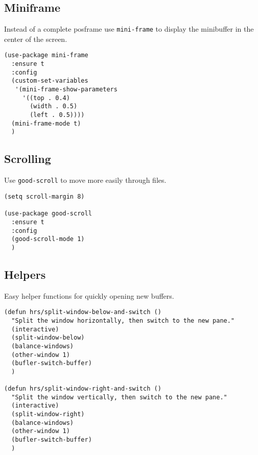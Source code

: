 \documentclass[11pt]{article}
\begin{document}
\subsection{Miniframe}
\label{sec:org151a413}
Instead of a complete posframe use \texttt{mini-frame} to display the
minibuffer in the center of the screen.
\begin{verbatim}
(use-package mini-frame
  :ensure t
  :config
  (custom-set-variables
   '(mini-frame-show-parameters
     '((top . 0.4)
       (width . 0.5)
       (left . 0.5))))
  (mini-frame-mode t)
  )
\end{verbatim}
\subsection{Scrolling}
\label{sec:org48c69ce}
Use \texttt{good-scroll} to move more easily through files.
\begin{verbatim}
(setq scroll-margin 8)

(use-package good-scroll
  :ensure t
  :config
  (good-scroll-mode 1)
  )
\end{verbatim}
\subsection{Helpers}
\label{sec:orgccd937e}
Easy helper functions for quickly opening new buffers.
\begin{verbatim}
(defun hrs/split-window-below-and-switch ()
  "Split the window horizontally, then switch to the new pane."
  (interactive)
  (split-window-below)
  (balance-windows)
  (other-window 1)
  (bufler-switch-buffer)
  )

(defun hrs/split-window-right-and-switch ()
  "Split the window vertically, then switch to the new pane."
  (interactive)
  (split-window-right)
  (balance-windows)
  (other-window 1)
  (bufler-switch-buffer)
  )
\end{verbatim}
\end{document}
